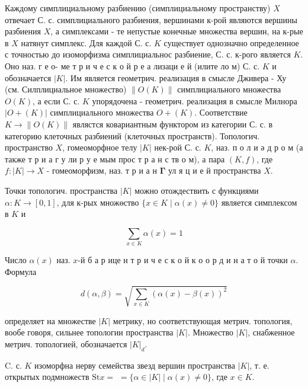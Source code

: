 \documentclass[10pt]{article}
\begin{document}
Каждому симплициальному разбиению (симплициальному пространству) $X$ отвечает С. с. симплициального разбиения, вершинами к-рой являются вершины разбиения $X$, а симплексами - те непустые конечные множества вершин, на к-рые в $X$ натянут симплекс. Для каждой С. с. $K$ существует однозначно определенное с точностью до изоморфизма симплициальнос разбиение, С. с. к-рого является $K$. Оно наз. г е о- ме т р и ч е с к о й р е а лизаци е й (илите ло м) С. с. $K$ и обозначается $|K|$. Им является геометрич. реализация в смысле Дживера - Ху (см. Силплициальное множество) $\|O(K)\|$ симплициального множества $O(K)$, а если С. с. $K$ упорядочена - геометрич. реализация в смысле Милнора $|O+(K)|$ симплициального множества $O+(K)$. Соответствие $K \rightarrow\|O(K)\|$ являстся ковариантным функтором из категории С. с. в категорию клеточных разбиений (клеточных пространств). Топологич. пространство $X$, гомеоморфное телу $|K|$ нек-рой С. с. $K$, наз. п о л и ә д р о м (а также т р и а г у ли р у е мым прос т р а н с тв о м), а пара $(K, f)$, где $f:|K| \rightarrow X$ - гомеоморфизм, наз. т р и а н $\boldsymbol{\Gamma}$ ул я ц и е й пространства $X$.



Точки топологич. пространства $|K|$ можно отождествить с функциями $\alpha: K \rightarrow[0,1]$, для к-рых множөство $\{x \in K \mid \alpha(x) \neq 0\}$ является симплексом в $K$ и



\[

\sum_{x \in K} \alpha(x)=1

\]



Число $\alpha(x)$ наз. $x$-й б а р ице н т р и ч е с к о й к о о р д и н а т о й точки $\alpha$. Формула



\[

d(\alpha, \beta)=\sqrt{\sum_{x \in K}(\alpha(x)-\beta(x))^{2}}

\]



определяет на множестве $|K|$ метрику, но соответствующая метрич. топология, вообе говоря, сильнее топологии пространства $|K|$. Множество $|K|$, снабженное метрич. топологией, обозначается $|K|_{d}$.



C. с. $K$ изоморфна нерву семейства звезд вершин пространства $|K|$, т. е. открытых подмножеств $\mathrm{St} x=$ $=\{\alpha \in|K| \mid \alpha(x) \neq 0\}$, где $x \in K$.
\end{document}
